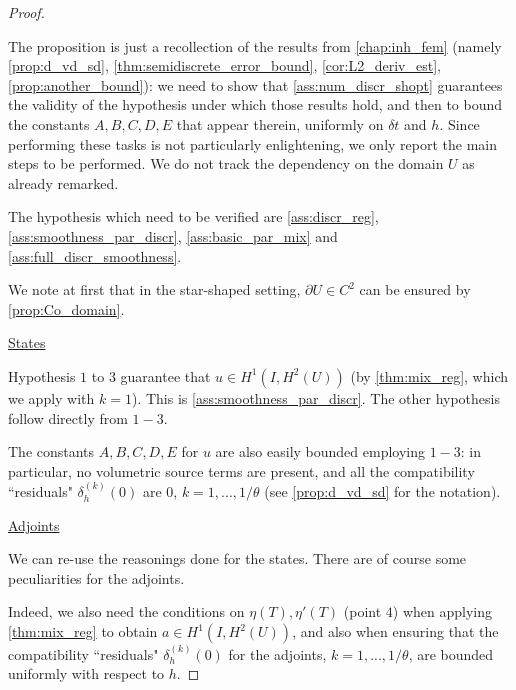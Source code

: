 \documentclass[english,a4paper,10pt,oneside]{scrbook}	%
\theoremstyle{break}
\newenvironment{mproof}[1][\proofname]{%
  \begin{proof}[#1]$ $\par\nobreak\ignorespaces
}{%
  \end{proof}
}
\renewcommand*{\proofname}{Proof}
\theoremstyle{remark}
\newcommand{\te}{\theta}
\begin{document}
\begin{mproof}

The proposition is just a recollection of the results from \cref{chap:inh_fem} (namely \cref{prop:d_vd_sd}, \cref{thm:semidiscrete_error_bound}, \cref{cor:L2_deriv_est}, \cref{prop:another_bound}): we need to show that \cref{ass:num_discr_shopt} guarantees the validity of the hypothesis under which those results hold, and then to bound the constants $A,B,C,D,E$ that appear therein, uniformly on $\delta t$ and $h$. Since performing these tasks is not particularly enlightening, we only report the main steps to be performed. We do not track the dependency on the domain $U$ as already remarked.




The hypothesis which need to be verified are \cref{ass:discr_reg}, \cref{ass:smoothness_par_discr}, \cref{ass:basic_par_mix} and \cref{ass:full_discr_smoothness}.

We note at first that in the star-shaped setting, $\partial U \in C^2$ can be ensured by \cref{prop:Co_domain}.

\underline{States}

Hypothesis $1$ to $3$ guarantee that $u \in H^1(I,H^2(U))$ (by \cref{thm:mix_reg}, which we apply with $k=1$). This is \cref{ass:smoothness_par_discr}. The other hypothesis follow directly from $1-3$.

The constants $A,B,C,D,E$ for $u$ are also easily bounded employing $1-3$: in particular, no volumetric source terms are present, and all the compatibility ``residuals" $\delta_h^{(k)}(0)$ are $0$, $k=1,...,1/\te$ (see \cref{prop:d_vd_sd} for the notation).

\underline{Adjoints}

We can re-use the reasonings done for the states. There are of course some peculiarities for the adjoints.

Indeed, we also need the conditions on $\eta(T), \eta'(T)$ (point $4$) when applying \cref{thm:mix_reg} to obtain $a \in H^1(I,H^2(U))$, and also when ensuring that the compatibility ``residuals" $\delta_h^{(k)}(0)$ for the adjoints, $k=1,...,1/\te$, are bounded uniformly with respect to $h$.


\end{mproof}
\end{document}
